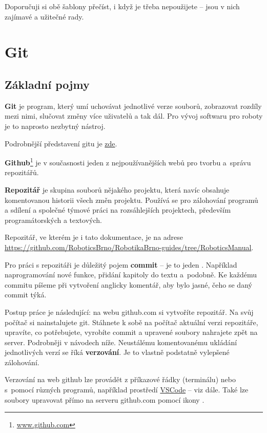Doporučuji si obě šablony přečíst, i když je třeba nepoužijete -- jsou v nich zajímavé a užitečné rady.

\section{Git} 


\subsection{Základní pojmy}


{\bf Git} je program, který umí uchovávat jednotlivé verze souborů, zobrazovat rozdíly mezi nimi, slučovat změny více uživatelů a tak dál. Pro vývoj softwaru pro roboty je to naprosto nezbytný nástroj. 

Podrobnější představení gitu je  \href{http://www.kutac.cz/blog/pocitace-a-internety/jak-na-git-dil-0-co-proc-jak/}{zde}.

{\bf Github}\footnote{\url{www.github.com}}  je v současnosti jeden z nejpoužívanějších webů pro tvorbu a~správu repozitářů.

{\bf Repozitář}  je skupina souborů nějakého projektu, která navíc obsahuje komentovanou historii všech změn projektu. Používá se pro zálohování programů a sdílení a společné týmové práci na rozsáhlejších projektech, především programátorských a textových. 

Repozitář, ve kterém je i tato dokumentace, je na adrese 
\url{https://github.com/RoboticsBrno/RobotikaBrno-guides/tree/RoboticsManual}.   

Pro práci s repozitáři je důležitý pojem {\bf commit}  -- je to jeden . 
Například naprogramování  nové funkce, přidání kapitoly do textu a~podobně. 
Ke každému commitu píšeme při vytvoření anglicky komentář, aby bylo jasné, čeho se daný commit týká.

Postup práce je následující: na webu github.com si vytvoříte repozitář. Na svůj počítač si nainstalujete git. Stáhnete k sobě na počítač aktuální verzi repozitáře, upravíte, co potřebujete, vyrobíte commit a upravené soubory nahrajete zpět na server. Podrobněji v návodech níže. 
Neustálému komentovanému ukládání jednotlivých verzí se říká {\bf verzování}. Je to vlastně podstatně vylepšené zálohování.

Verzování na web github lze provádět z příkazové řádky (terminálu) nebo s~pomocí různých programů, například prostředí \hyperref[vscode]{VSCode} -- viz dále. 
Také lze soubory upravovat přímo na serveru github.com pomocí ikony .

